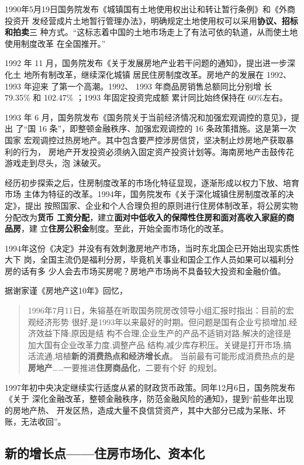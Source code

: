 1990年5月19日国务院发布《城镇国有土地使用权出让和转让暂行条例》和《外商投资开
发经营成片土地暂行管理办法》，明确规定土地使用权可以采用\textbf{协议、招标和拍卖}三
种方式。“这标志着中国的土地市场走上了有法可依的轨道，从而使土地使用制度改革
在全国推开。”


1992 年 11 月，国务院发布《关于发展房地产业若干问题的通知》，提出进一步深化土
地所有制改革，继续深化城镇 居民住房制度改革。房地产的发展在 1992、1993 年迎来
了第一个高潮。1992、 1993 年商品房销售总额同比分别增
长 79.35\% 和 102.47\% ；1993 年固定投资完成额 累计同比始终保持在 60\%左右。

1993 年 6 月，国务院发布《国务院关于当前经济情况和加强宏观调控的意见》，提出
了“国 16 条”，即整顿金融秩序、加强宏观调控的 16 条政策措施。这是第一次国家
宏观调控过热房地产。其中包含要严控涉房信贷，坚决制止炒房地产获取暴利的行为，
房地产开发投资必须纳入固定资产投资计划等。海南房地产击鼓传花游戏走到尽头，泡
沫破灭。

经历初步探索之后，住房制度改革的市场化特征显现，逐渐形成以权力下放、培育市场
主体为特征的改革。1994年，国务院发布《关于深化城镇住房制度改革的决定》，提出
按照国家、企业和个人合理负担的原则进行住房体制改革，将公房实物分配改为\textbf{货币
  工资分配}，建立\textbf{面对中低收入的保障性住房和面对高收入家庭的商品房}，建
立\textbf{住房公积金}制度。至此，开始全面市场化的改革。\cite{CJZK201802012}

1994年这份《决定》并没有有效刺激房地产市场，当时东北国企已开始出现实质性大下
岗，全国主流仍是福利分房，毕竟机关事业和国企工作人员如果可以福利分房的话有多
少人会去市场买房呢？房地产市场尚不具备较大投资和金融价值。

据谢家谨《房地产这10年》回忆，
\begin{quotation}
  1996年7月11日，朱镕基在听取国务院房改领导小组汇报时指出：目前的宏观经济形势
  很好,是1993年以来最好的时期。但问题是国有企业亏损增加,经济效益下降;原因是结
  构不合理,企业生产的产品不适销对路;解决的途径是加大国有企业改革力度,调整产品
  结构,减少库存积压。关键是打开市场,搞活流通,培植\textbf{新的消费热点和经济增长点}。
  当前最有可能形成消费热点的是\textbf{房地产}……一要推进\textbf{住房商品化}，二要有个好
  的规划。
\end{quotation}

1997年初中央决定继续实行适度从紧的财政货币政策。同年12月6日，国务院发布《关于
深化金融改革，整顿金融秩序，防范金融风险的通知》，提到“前些年出现的房地产热、
开发区热，造成大量不良信贷资产，其中大部分已成为呆账、坏账，无法收回”。


\subsection{新的增长点——住房市场化、资本化}



